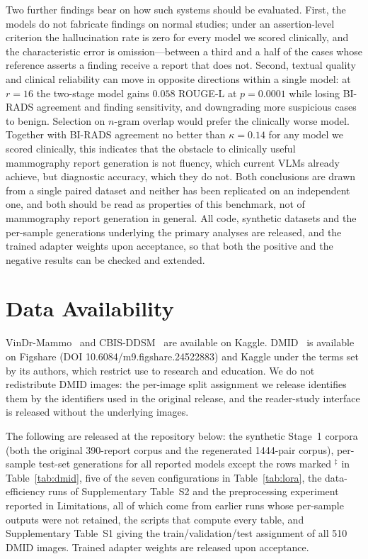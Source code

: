 \documentclass{wlscirep}
\begin{document}
Two further findings bear on how such systems should be evaluated. First, the models do not fabricate findings on normal studies; under an assertion-level criterion the hallucination rate is zero for every model we scored clinically, and the characteristic error is omission---between a third and a half of the cases whose reference asserts a finding receive a report that does not. Second, textual quality and clinical reliability can move in opposite directions within a single model: at $r=16$ the two-stage model gains $0.058$ ROUGE-L at $p=0.0001$ while losing BI-RADS agreement and finding sensitivity, and downgrading more suspicious cases to benign. Selection on $n$-gram overlap would prefer the clinically worse model. Together with BI-RADS agreement no better than $\kappa = 0.14$ for any model we scored clinically, this indicates that the obstacle to clinically useful mammography report generation is not fluency, which current VLMs already achieve, but diagnostic accuracy, which they do not. Both conclusions are drawn from a single paired dataset and neither has been replicated on an independent one, and both should be read as properties of this benchmark, not of mammography report generation in general. All code, synthetic datasets and the per-sample generations underlying the primary analyses are released, and the trained adapter weights upon acceptance, so that both the positive and the negative results can be checked and extended.

\section*{Data Availability}

VinDr-Mammo~\cite{nguyen2023vindr} and CBIS-DDSM~\cite{lee2017curated} are available on Kaggle. DMID~\cite{oza2024} is available on Figshare (DOI 10.6084/m9.figshare.24522883) and Kaggle under the terms set by its authors, which restrict use to research and education. We do not redistribute DMID images: the per-image split assignment we release identifies them by the identifiers used in the original release, and the reader-study interface is released without the underlying images.

The following are released at the repository below: the synthetic Stage~1 corpora (both the original 390-report corpus and the regenerated 1444-pair corpus), per-sample test-set generations for all reported models except the rows marked $^{\ddagger}$ in Table~\ref{tab:dmid}, five of the seven configurations in Table~\ref{tab:lora}, the data-efficiency runs of Supplementary Table~S2 and the preprocessing experiment reported in Limitations, all of which come from earlier runs whose per-sample outputs were not retained, the scripts that compute every table, and Supplementary Table~S1 giving the train/validation/test assignment of all 510 DMID images. Trained adapter weights are released upon acceptance.
\end{document}
